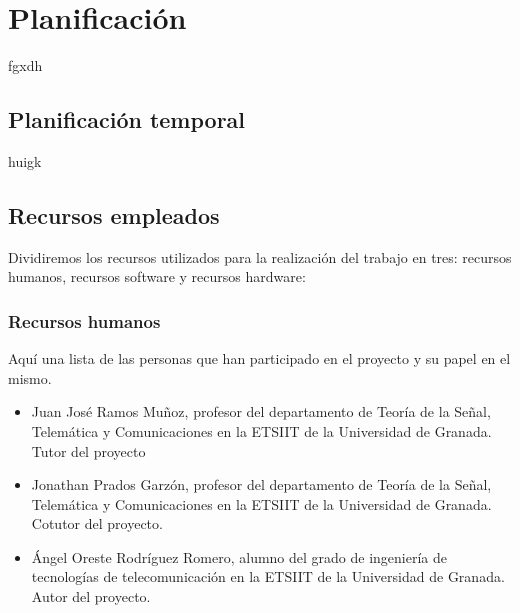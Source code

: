 \chapter{Planificación}\label{chap:Plan}

fgxdh

\section{Planificación temporal}

huigk

\section{Recursos empleados}
Dividiremos los recursos utilizados para la realización del trabajo en tres: recursos humanos, recursos software y recursos hardware:

\subsection{Recursos humanos}
Aquí una lista de las personas que han participado en el proyecto y su papel en el mismo.
\begin{itemize}
\item Juan José Ramos Muñoz, profesor del departamento de Teoría de
la Señal, Telemática y Comunicaciones en la ETSIIT de la Universidad de Granada. Tutor del proyecto
\item Jonathan Prados Garzón, profesor del departamento de Teoría de
la Señal, Telemática y Comunicaciones en la ETSIIT de la Universidad de Granada.
Cotutor del proyecto.
\item Ángel Oreste Rodríguez Romero, alumno del grado de ingeniería de tecnologías de telecomunicación en la ETSIIT de la Universidad de Granada. Autor del proyecto.
\end{itemize}

